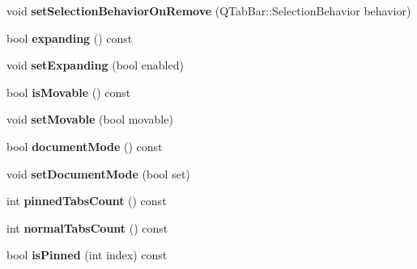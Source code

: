 \begin{DoxyCompactItemize}
\item 
\hypertarget{class_combo_tab_bar_a82daa9a45f727324ab5116288f19e33b}{
void {\bfseries setSelectionBehaviorOnRemove} (QTabBar::SelectionBehavior behavior)}
\label{class_combo_tab_bar_a82daa9a45f727324ab5116288f19e33b}

\item 
\hypertarget{class_combo_tab_bar_a71f4f34d1dc4701d3e6ca51c1c460479}{
bool {\bfseries expanding} () const }
\label{class_combo_tab_bar_a71f4f34d1dc4701d3e6ca51c1c460479}

\item 
\hypertarget{class_combo_tab_bar_a565062955f4c49d62498a7f542a7cdd3}{
void {\bfseries setExpanding} (bool enabled)}
\label{class_combo_tab_bar_a565062955f4c49d62498a7f542a7cdd3}

\item 
\hypertarget{class_combo_tab_bar_ac1892c7f5c092995acd1f2efb8911a66}{
bool {\bfseries isMovable} () const }
\label{class_combo_tab_bar_ac1892c7f5c092995acd1f2efb8911a66}

\item 
\hypertarget{class_combo_tab_bar_a0e551055d8ac21acb511fbc54b9218a8}{
void {\bfseries setMovable} (bool movable)}
\label{class_combo_tab_bar_a0e551055d8ac21acb511fbc54b9218a8}

\item 
\hypertarget{class_combo_tab_bar_a72020d7411a8fed3927e4bef752cccf7}{
bool {\bfseries documentMode} () const }
\label{class_combo_tab_bar_a72020d7411a8fed3927e4bef752cccf7}

\item 
\hypertarget{class_combo_tab_bar_ae63a0415722d0a9e7cb078f67fb5ce8e}{
void {\bfseries setDocumentMode} (bool set)}
\label{class_combo_tab_bar_ae63a0415722d0a9e7cb078f67fb5ce8e}

\item 
\hypertarget{class_combo_tab_bar_ad14aa7e400982a67345b64abb1e9b82d}{
int {\bfseries pinnedTabsCount} () const }
\label{class_combo_tab_bar_ad14aa7e400982a67345b64abb1e9b82d}

\item 
\hypertarget{class_combo_tab_bar_a190dfb072e02cd1064952881dc582ae3}{
int {\bfseries normalTabsCount} () const }
\label{class_combo_tab_bar_a190dfb072e02cd1064952881dc582ae3}

\item 
\hypertarget{class_combo_tab_bar_a9c4413dce9ceba2b42f4cb9fe2eb6c03}{
bool {\bfseries isPinned} (int index) const }
\label{class_combo_tab_bar_a9c4413dce9ceba2b42f4cb9fe2eb6c03}


\end{DoxyCompactItemize}
